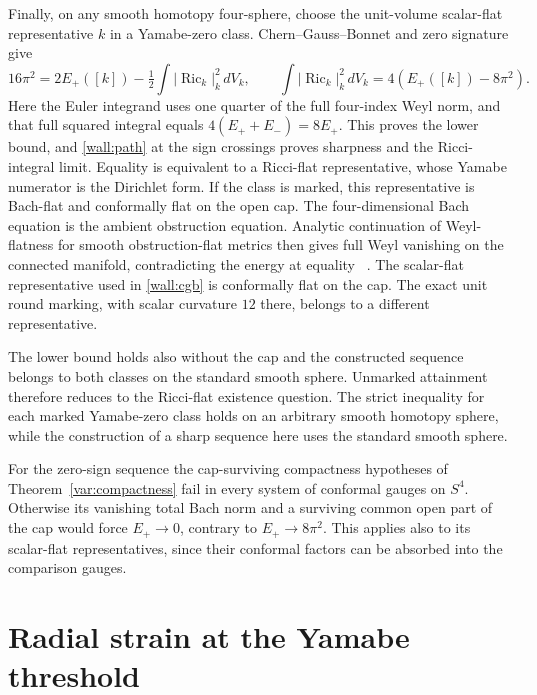 \documentclass[11pt]{article}
\numberwithin{equation}{section}
\theoremstyle{definition}
\theoremstyle{remark}
\begin{document}
Finally, on any smooth homotopy four-sphere, choose the unit-volume
scalar-flat representative \(k\) in a Yamabe-zero class.
Chern--Gauss--Bonnet and zero signature give
\begin{equation}\label{wall:cgb}
 16\pi^2=2E_+([k])-\tfrac12\int|\operatorname{Ric}_k|_k^2\,dV_k,
 \qquad
 \int|\operatorname{Ric}_k|_k^2\,dV_k=4(E_+([k])-8\pi^2).
\end{equation}
Here the Euler integrand uses one quarter of the full four-index
Weyl norm, and that full squared integral equals
\(4(E_++E_-)=8E_+\). This proves the lower bound, and
\eqref{wall:path} at the sign crossings proves sharpness and
the Ricci-integral limit. Equality is equivalent to a Ricci-flat
representative, whose Yamabe numerator is the Dirichlet form.
If the class is marked, this representative is Bach-flat and
conformally flat on the open cap. The four-dimensional Bach
equation is the ambient obstruction equation. Analytic
continuation of Weyl-flatness for smooth obstruction-flat metrics
then gives full Weyl vanishing on the connected manifold,
contradicting the energy at equality~\cite[(0.4), Remark 2]{ChangGurskyYang2003}
\cite{GrahamHirachi2004Ambient}
\cite[Theorem 1.4]{LassasLiimatainen2019ConformalHarmonic}.
The scalar-flat representative used in \eqref{wall:cgb} is
conformally flat on the cap. The exact unit round marking, with
scalar curvature \(12\) there, belongs to a different representative.

The lower bound holds also without the cap and the constructed
sequence belongs to both classes on the standard smooth sphere.
Unmarked attainment therefore reduces to the Ricci-flat existence
question. The strict inequality for each marked Yamabe-zero class
holds on an arbitrary smooth homotopy sphere, while the construction
of a sharp sequence here uses the standard smooth sphere.

For the zero-sign sequence the cap-surviving compactness
hypotheses of Theorem~\ref{var:compactness} fail in every system of
conformal gauges on \(S^4\). Otherwise its vanishing total Bach norm
and a surviving common open part of the cap would force \(E_+\to0\),
contrary to \(E_+\to8\pi^2\). This applies also to its scalar-flat
representatives, since their conformal factors can be absorbed into
the comparison gauges.

\section{Radial strain at the Yamabe threshold}\label{mscost:section}
\end{document}
